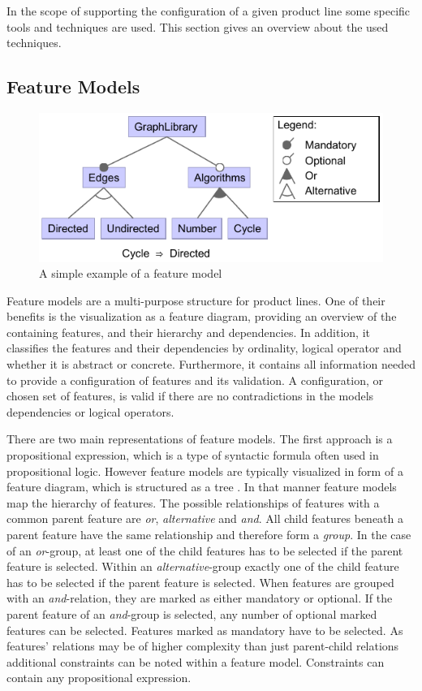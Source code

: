 In the scope of supporting the configuration of a given product line some specific tools and techniques are used. This section gives an overview about the used techniques.

\subsection{Feature Models} \label{ch:fm}
\begin{figure}
	\includegraphics{img/img-fm.pdf}
	\caption{A simple example of a feature model}
	\label{img-fm}
\end{figure}

Feature models are a multi-purpose structure for product lines. One of their benefits is the visualization as a feature diagram, providing an overview of the containing features, and their hierarchy and dependencies. In addition, it classifies the features and their dependencies by ordinality, logical operator and whether it is abstract or concrete. Furthermore, it contains all information needed to provide a configuration of features and its validation. A configuration, or chosen set of features, is valid if there are no contradictions in the models dependencies or logical operators.

There are two main representations of feature models. The first approach is a propositional expression, which is a type of syntactic formula often used in propositional logic. However feature models are typically visualized in form of a feature diagram, which is structured as a tree \cite{fmgp}. In that manner feature models map the hierarchy of features. The possible relationships of features with a common parent feature are \textit{or}, \textit{alternative} and \textit{and}. All child features beneath a parent feature have the same relationship and therefore form a \textit{group}. In the case of an \textit{or}-group, at least one of the child features has to be selected if the parent feature is selected. Within an \textit{alternative}-group exactly one of the child feature has to be selected if the parent feature is selected. When features are grouped with an \textit{and}-relation, they are marked as either mandatory or optional. If the parent feature of an \textit{and}-group is selected, any number of optional marked features can be selected. Features marked as mandatory have to be selected. As features' relations may be of higher complexity than just parent-child relations additional constraints can be noted within a feature model. Constraints can contain any propositional expression.

